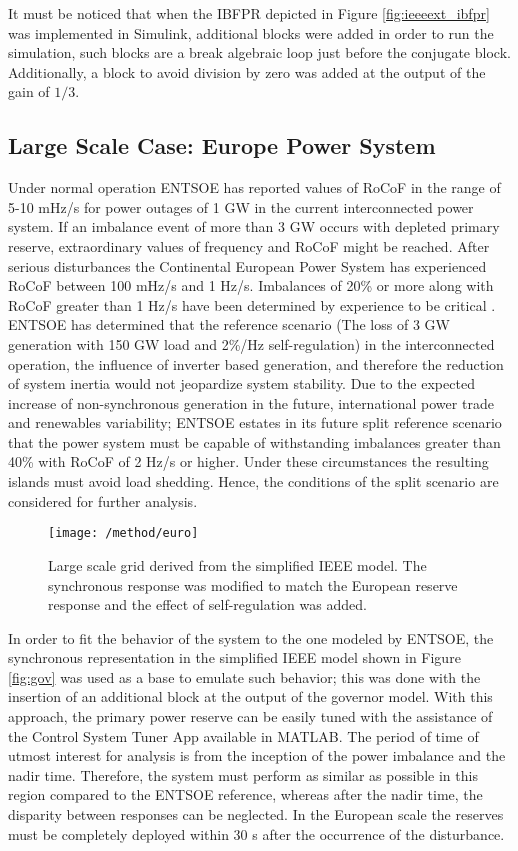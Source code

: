 It must be noticed that when the IBFPR depicted in Figure \ref{fig:ieeeext_ibfpr} was implemented in Simulink, additional blocks were added in order to run the simulation, such blocks are a break algebraic loop just before the conjugate block. Additionally, a block to avoid division by zero was added at the output of the gain of $ 1 /3 $.

\subsection{Large Scale Case: Europe Power System}

Under normal operation ENTSOE has reported values of RoCoF in the range of 5-10 mHz/s for power outages of 1 GW in the current interconnected power system. If an imbalance event of more than 3 GW occurs with depleted primary reserve, extraordinary values of frequency and RoCoF might be reached. After serious disturbances the Continental European Power System has experienced RoCoF between 100 mHz/s and 1 Hz/s. Imbalances of 20\% or more along with RoCoF greater than 1 Hz/s have been determined by experience to be critical \cite{ENTSOE.2016}. ENTSOE has determined that the reference scenario (The loss of 3 GW generation with 150 GW load and 2\%/Hz self-regulation) in the interconnected operation, the influence of inverter based generation, and therefore the reduction of system inertia would not jeopardize system stability. Due to the expected increase of non-synchronous generation in the future, international power trade and renewables variability; ENTSOE estates in its future split reference scenario that the power system must be capable of withstanding imbalances greater than 40\% with RoCoF of 2 Hz/s or higher. Under these circumstances the resulting islands must avoid load shedding. Hence, the conditions of the split scenario are considered for further analysis.
\begin{figure}[h]
	\centering
	\texttt{[image: /method/euro]}
	\caption{Large scale grid derived from the simplified IEEE model. The synchronous response was modified to match the European reserve response and the effect of self-regulation was added.}
	\label{fig:euro}
\end{figure}

In order to fit the behavior of the system to the one modeled by ENTSOE, the synchronous representation in the simplified IEEE model shown in Figure \ref{fig:gov} was used as a base to emulate such behavior; this was done with the insertion of an additional block at the output of the governor model. With this approach, the primary power reserve can be easily tuned with the assistance of the Control System Tuner App available in MATLAB. The period of time of utmost interest for analysis is from the inception of the power imbalance and the nadir time. Therefore, the system must perform as similar as possible in this region compared to the ENTSOE reference, whereas after the nadir time, the disparity between responses can be neglected. In the European scale the reserves must be completely deployed within 30 s after the occurrence of the disturbance. 

